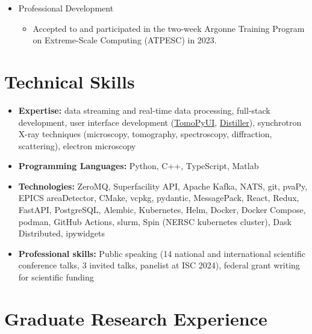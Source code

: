 \documentclass[11pt]{article} %
\begin{document}
\begin{itemize}
  \item Professional Development
    \begin{itemize}
      \item Accepted to and participated in the two-week Argonne Training Program on Extreme-Scale Computing (ATPESC) in 2023.
    \end{itemize}
\end{itemize}

\section{Technical Skills}

\begin{itemize}
  \item \textbf{Expertise:} data streaming and real-time data processing, full-stack development, user interface development (\href{https://tomopyui.readthedocs.io/en/latest/}{TomoPyUI}, \href{https://github.com/OpenChemistry/distiller}{Distiller}), synchrotron X-ray techniques (microscopy, tomography, spectroscopy, diffraction, scattering), electron microscopy
  \item \textbf{Programming Languages:} Python, C++, TypeScript, Matlab
  \item \textbf{Technologies:} ZeroMQ, Superfacility API, Apache Kafka, NATS, git, pvaPy, EPICS areaDetector, CMake, vcpkg, pydantic, MessagePack, React, Redux, FastAPI, PostgreSQL, Alembic, Kubernetes, Helm, Docker, Docker Compose, podman, GitHub Actions, slurm, Spin (NERSC kubernetes cluster), Dask Distributed, ipywidgets
  \item \textbf{Professional skills:} Public speaking (14 national and international scientific conference talks, 3 invited talks, panelist at ISC 2024), federal grant writing for scientific funding
\end{itemize}

\section{Graduate Research Experience}
\end{document}
